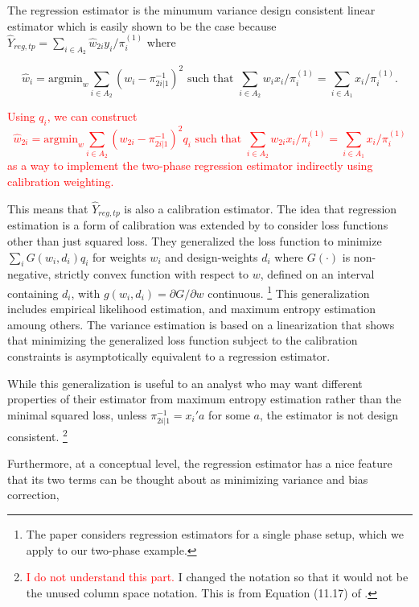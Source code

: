 \documentclass[12pt]{article}
\newcommand{\argmin}{{\text{argmin}}}
\begin{document}
  
The regression
estimator is the minumum variance design consistent linear estimator which is
easily shown to be the case because $\hat Y_{reg, tp} = \sum_{i \in A_2} \hat
w_{2i} y_i / \pi_i^{(1)}$ where 

$$\hat w_i = \argmin_{w} \sum_{i \in A_2} (w_i - \pi_{2i|1}^{-1})^2 \text{ such
that } \sum_{i \in A_2} w_i x_i / \pi_i^{(1)} = \sum_{i \in A_1} x_i /
\pi_i^{(1)}.$$

\textcolor{red}{Using $q_i$, we can construct 
$$\hat w_{2i} = \argmin_{w} \sum_{i \in A_2} (w_{2i} - \pi_{2i|1}^{-1})^2  q_i \text{ such
that } \sum_{i \in A_2} w_{2i}  x_i / \pi_i^{(1)} = \sum_{i \in A_1} x_i /
\pi_i^{(1)}$$
as a way to implement the two-phase regression estimator indirectly using calibration weighting. 
}


This means that $\hat Y_{reg, tp}$ is also a calibration estimator. The idea
that regression estimation is a form of calibration was extended by 
\cite{deville1992calibration} to consider loss functions other than just squared
loss. They generalized the loss function to minimize $\sum_i G(w_i, d_i)q_i$ for
weights $w_i$ and design-weights $d_i$ where $G(\cdot)$ is non-negative, strictly
convex function with respect to $w$, defined on an interval containing $d_i$,
with $g(w_i, d_i) = \partial G / \partial w$ continuous.
\footnote{The \cite{deville1992calibration} paper considers regression estimators
for a single phase setup, which we apply to our two-phase example. } This
generalization includes empirical likelihood estimation, and maximum entropy
estimation amoung others. The variance estimation is based on a linearization
that shows that minimizing the generalized loss function subject to the
calibration constraints is asymptotically equivalent to a regression estimator.

While this generalization is useful to an analyst who may want different
properties of their estimator from maximum entropy estimation rather than the
minimal squared loss, 
unless $\pi_{2i|1}^{-1} = x_i'a$ for some $a$, the
estimator is not design consistent. 
\footnote{ \textcolor{red}{I do not understand this part.} I changed the
notation so that it would not be the unused column space notation. This is from
Equation (11.17) of \cite{kim2024statistics}.} 

Furthermore, at a conceptual level, the regression estimator
has a nice feature that its two terms can be thought about as minimizing
variance and bias correction,
\end{document}
